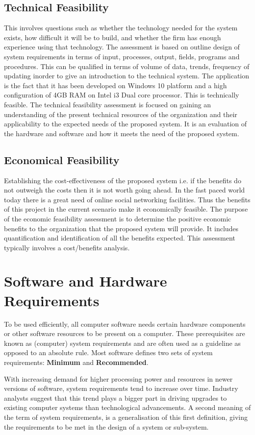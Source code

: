 \subsection{Technical Feasibility}

\par This involves questions such as whether the technology needed for the system exists, how difficult
it will be to build, and whether the firm has enough experience using that technology. The
assessment is based on outline design of system requirements in terms of input, processes, output,
fields, programs and procedures. This can be qualified in terms of volume of data, trends, frequency
of updating inorder to give an introduction to the technical system. The application is the fact that it
has been developed on Windows 10 platform and a high configuration of 4GB RAM on Intel
i3 Dual core processor. This is technically feasible. The technical feasibility assessment is
focused on gaining an understanding of the present technical resources of the organization and their
applicability to the expected needs of the proposed system. It is an evaluation of the hardware and
software and how it meets the need of the proposed system.
\subsection{Economical Feasibility}
\par Establishing the cost-effectiveness of the proposed system i.e. if the benefits do not outweigh the
costs then it is not worth going ahead. In the fast paced world today there is a great need of online
social networking facilities. Thus the benefits of this project in the current scenario make it
economically feasible. The purpose of the economic feasibility assessment is to determine the
positive economic benefits to the organization that the proposed system will provide. It includes
quantification and identification of all the benefits expected. This assessment typically involves a
cost/benefits analysis.

\newpage
\section{Software and Hardware Requirements}

\par To be used efficiently, all computer software needs certain hardware components or other software resources to be present on a computer. These prerequisites are known as (computer) system requirements and are often used as a guideline as opposed to an absolute rule. Most software defines two sets of system requirements: \textbf{Minimum} and \textbf{Recommended}. \par With increasing demand for higher processing power and resources in newer versions of software, system requirements tend to increase over time. Industry analysts suggest that this trend plays a bigger part in driving upgrades to existing computer systems than technological advancements. A second meaning of the term of system requirements, is a generalisation of this first definition, giving the requirements to be met in the design of a system or sub-system.

